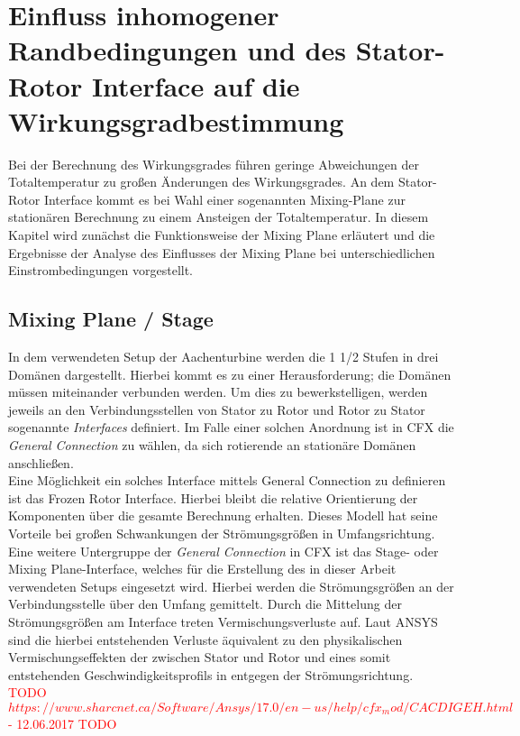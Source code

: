 \chapter{Einfluss inhomogener Randbedingungen und des Stator-Rotor Interface auf die Wirkungsgradbestimmung}
\label{cha:kanal}
Bei der Berechnung des Wirkungsgrades führen geringe Abweichungen der Totaltemperatur zu großen Änderungen des Wirkungsgrades. An dem Stator-Rotor Interface kommt es bei Wahl einer sogenannten Mixing-Plane zur stationären Berechnung zu einem Ansteigen der Totaltemperatur. In diesem Kapitel wird zunächst die Funktionsweise der Mixing Plane erläutert und die Ergebnisse der Analyse des Einflusses der Mixing Plane bei unterschiedlichen Einstrombedingungen vorgestellt.
\section{Mixing Plane / Stage}
In dem verwendeten Setup der Aachenturbine werden die 1 1/2 Stufen in drei Domänen dargestellt. Hierbei kommt es zu einer Herausforderung; die Domänen müssen miteinander verbunden werden. Um dies zu bewerkstelligen, werden jeweils an den Verbindungsstellen von Stator zu Rotor und Rotor zu Stator sogenannte \textit{Interfaces} definiert.
Im Falle einer solchen Anordnung ist in CFX die \textit{General Connection} zu wählen, da sich rotierende an stationäre Domänen anschließen.\\
Eine Möglichkeit ein solches Interface mittels General Connection zu definieren ist das Frozen Rotor Interface. Hierbei bleibt die relative Orientierung der Komponenten über die gesamte Berechnung erhalten. 
Dieses Modell hat seine Vorteile bei großen Schwankungen der Strömungsgrößen in Umfangsrichtung.\\
Eine weitere Untergruppe der \textit{General Connection} in CFX ist das Stage- oder Mixing Plane-Interface, welches für die Erstellung des in dieser Arbeit verwendeten Setups eingesetzt wird. Hierbei werden die Strömungsgrößen an der Verbindungsstelle über den Umfang gemittelt.
Durch die Mittelung der Strömungsgrößen am Interface treten Vermischungsverluste auf. Laut ANSYS sind die hierbei entstehenden Verluste äquivalent zu den physikalischen Vermischungseffekten der zwischen Stator und Rotor und eines somit entstehenden Geschwindigkeitsprofils in entgegen der Strömungsrichtung.\\
\textcolor{red}{TODO ${https://www.sharcnet.ca/Software/Ansys/17.0/en-us/help/cfx_mod/CACDIGEH.html} $- 12.06.2017 TODO}
